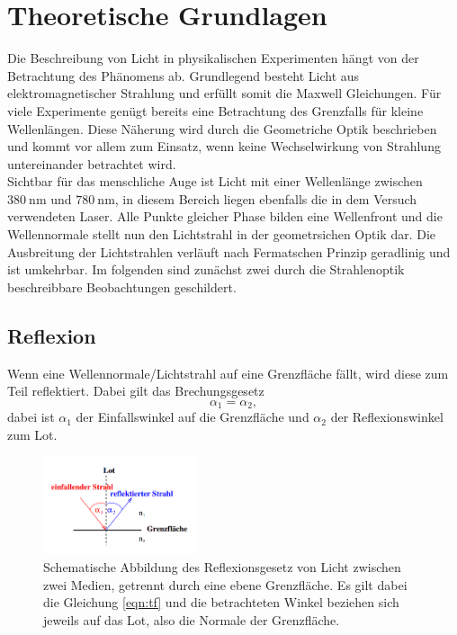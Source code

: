 \section{Theoretische Grundlagen}

Die Beschreibung von Licht in physikalischen Experimenten hängt von der Betrachtung des Phänomens ab. Grundlegend besteht Licht aus elektromagnetischer Strahlung und erfüllt somit die Maxwell Gleichungen. Für viele 
Experimente genügt bereits eine Betrachtung des Grenzfalls für kleine Wellenlängen. Diese Näherung wird durch die Geometriche Optik beschrieben und kommt vor allem zum Einsatz, wenn keine Wechselwirkung von Strahlung
untereinander betrachtet wird. 
\\
Sichtbar für das menschliche Auge ist Licht mit einer Wellenlänge zwischen $\SI{380}{\nano\meter}$ und $\SI{780}{\nano\meter}$, in diesem Bereich liegen ebenfalls die in dem Versuch verwendeten Laser.
Alle Punkte gleicher Phase bilden eine Wellenfront und die Wellennormale stellt nun den Lichtstrahl in der geometrsichen Optik dar.
Die Ausbreitung der Lichtstrahlen verläuft nach Fermatschen Prinzip geradlinig und ist umkehrbar.
Im folgenden sind zunächst zwei durch die Strahlenoptik beschreibbare Beobachtungen geschildert.

\subsection{Reflexion}
Wenn eine Wellennormale/Lichtstrahl auf eine Grenzfläche fällt, wird diese zum Teil reflektiert. Dabei gilt das Brechungsgesetz \cite{skript}
\begin{equation}
    \label{eqn:tf}
\alpha_{1} = \alpha_{2},
\end{equation}
dabei ist $\alpha_{1}$ der Einfallswinkel auf die Grenzfläche und $\alpha_{2}$ der Reflexionswinkel zum Lot.
\begin{figure}
    \centering
    \includegraphics[width=0.4\textwidth]{bilder/1.png}
    \caption{Schematische Abbildung des Reflexionsgesetz von Licht zwischen zwei Medien, getrennt durch eine ebene Grenzfläche. Es gilt dabei die Gleichung \eqref{eqn:tf} und die betrachteten Winkel beziehen sich jeweils auf das Lot, also 
    die Normale der Grenzfläche.\cite{skript}}
    \label{fig:reflexion}
\end{figure}

